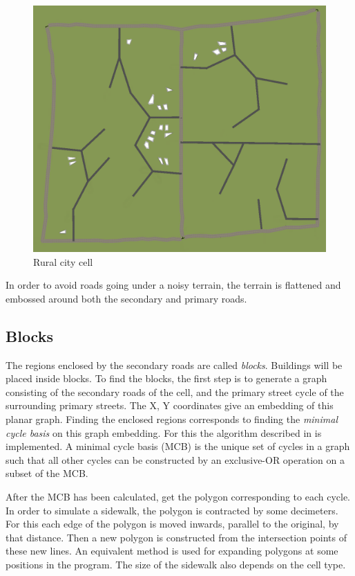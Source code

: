 \documentclass[a4paper,12pt]{scrartcl}
\begin{document}
\begin{figure}[h]
\center
\includegraphics[width=\textwidth]{cellR.png}
\caption{Rural city cell}
\label{fig:cellR}
\end{figure}

In order to avoid roads going under a noisy terrain, the terrain is flattened and embossed around both the secondary and primary roads.


\subsection{Blocks}
The regions enclosed by the secondary roads are called \emph{blocks}. Buildings will be placed inside blocks. To find the blocks, the first step is to generate a graph consisting of the secondary roads of the cell, and the primary street cycle of the surrounding primary streets. The X, Y coordinates give an embedding of this planar graph. Finding the enclosed regions corresponds to finding the \emph{minimal cycle basis} on this graph embedding. For this the algorithm described in \cite{Eber2005} is implemented. A minimal cycle basis (MCB) is the unique set of cycles in a graph such that all other cycles can be constructed by an exclusive-OR operation on a subset of the MCB.

After the MCB has been calculated, get the polygon corresponding to each cycle. In order to simulate a sidewalk, the polygon is contracted by some decimeters. For this each edge of the polygon is moved inwards, parallel to the original, by that distance. Then a new polygon is constructed from the intersection points of these new lines. An equivalent method is used for expanding polygons at some positions in the program. The size of the sidewalk also depends on the cell type.
\end{document}
